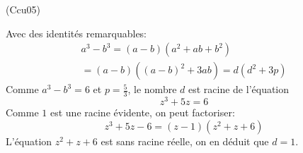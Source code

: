 \begin{tiny}(Ccu05)\end{tiny} Avec des identités remarquables:
\begin{multline*}
  a^3-b^3 = (a-b)(a^2+ab+b^2)\\ = (a-b)((a-b)^2+3ab) = d(d^2+3p)
\end{multline*}
Comme $a^3-b^3 = 6$ et $p = \frac{5}{3}$, le nombre $d$ est racine de l'équation
\begin{displaymath}
  z^3 + 5z = 6
\end{displaymath}
Comme $1$ est une racine évidente, on peut factoriser:
\begin{displaymath}
  z^3 + 5z -6 =(z-1)(z^2+z+6)
\end{displaymath}
L'équation $z^2+z+6$ est sans racine réelle, on en déduit que $d=1$.